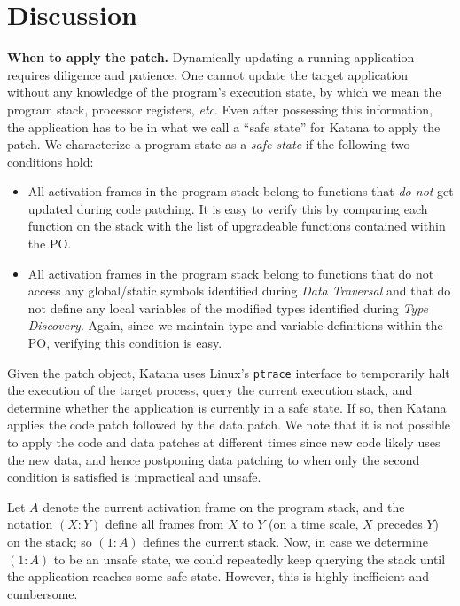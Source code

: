 \section{Discussion}

{\bf When to apply the patch.}
%
Dynamically updating a running application requires diligence and
patience. One cannot update the target application without any
knowledge of the program's execution state, by which we mean the
program stack, processor registers, {\it etc}.  Even after possessing
this information, the application has to be in what we call a ``safe
state'' for Katana to apply the patch. We characterize a program state
as a {\it safe state} if the following two conditions hold:
\begin{itemize}
\item All activation frames in the program stack belong to functions
  that {\it do not} get updated during code patching. It is easy to
  verify this by comparing each function on the stack with the list of
  upgradeable functions contained within the PO.

\item All activation frames in the program stack belong to functions
  that do not access any global/static symbols identified during {\it
    Data Traversal} and that do not define any local variables of the
  modified types identified during {\it Type Discovery}. Again, since
  we maintain type and variable definitions within the PO, verifying
  this condition is easy.
\end{itemize}

Given the patch object, Katana uses Linux's {\tt ptrace} interface to
temporarily halt the execution of the target process, query the
current execution stack, and determine whether the application is currently
in a safe state. If so, then Katana applies the code patch followed by
the data patch. We note that it is not possible to apply the code and
data patches at different times since new code likely uses the new
data, and hence postponing data patching to when only the second
condition is satisfied is impractical and unsafe.

Let $A$ denote the current activation frame on the program stack,
and the notation $(X:Y)$ define all frames from $X$ to $Y$ (on a time
scale, $X$ precedes $Y$) on the stack; so $(1:A)$ defines the current
stack. Now, in case we determine $(1:A)$ to be an unsafe state, we
could repeatedly keep querying the stack until the application reaches
some safe state. However, this is highly inefficient and cumbersome.


